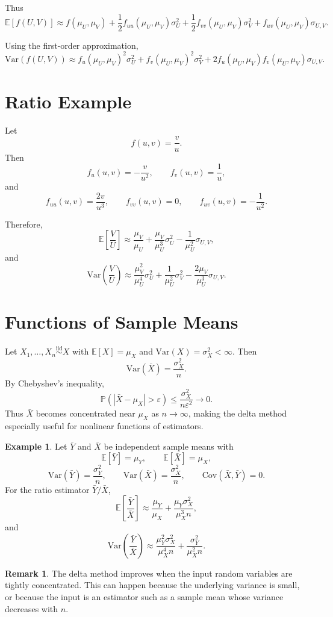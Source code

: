 \documentclass[12pt,oneside]{book}
\numberwithin{equation}{section}
\theoremstyle{definition}
\newtheorem{example}{Example}[section]
\newtheorem{remark}{Remark}[section]
\theoremstyle{plain}
\theoremstyle{remark}
\newcommand{\E}{\mathbb{E}}
\newcommand{\Var}{\mathrm{Var}}
\newcommand{\Cov}{\mathrm{Cov}}
\newcommand{\Prob}{\mathbb{P}}
\newcommand{\iid}{\overset{\text{iid}}{\sim}}
\begin{document}
Thus
\[
\E[f(U,V)]
\approx
f(\mu_U,\mu_V)
+ \frac{1}{2}f_{uu}(\mu_U,\mu_V)\sigma_U^2
+ \frac{1}{2}f_{vv}(\mu_U,\mu_V)\sigma_V^2
+ f_{uv}(\mu_U,\mu_V)\sigma_{U,V}.
\]

Using the first-order approximation,
\[
\Var(f(U,V))
\approx
f_u(\mu_U,\mu_V)^2\sigma_U^2
+
f_v(\mu_U,\mu_V)^2\sigma_V^2
+
2f_u(\mu_U,\mu_V)f_v(\mu_U,\mu_V)\sigma_{U,V}.
\]

\section{Ratio Example}

Let
\[
f(u,v)=\frac{v}{u}.
\]
Then
\[
f_u(u,v)=-\frac{v}{u^2},
\qquad
f_v(u,v)=\frac{1}{u},
\]
and
\[
f_{uu}(u,v)=\frac{2v}{u^3},
\qquad
f_{vv}(u,v)=0,
\qquad
f_{uv}(u,v)=-\frac{1}{u^2}.
\]

Therefore,
\[
\E\left[\frac{V}{U}\right]
\approx
\frac{\mu_V}{\mu_U}
+
\frac{\mu_V}{\mu_U^3}\sigma_U^2
-
\frac{1}{\mu_U^2}\sigma_{U,V},
\]
and
\[
\Var\left(\frac{V}{U}\right)
\approx
\frac{\mu_V^2}{\mu_U^4}\sigma_U^2
+
\frac{1}{\mu_U^2}\sigma_V^2
-
\frac{2\mu_V}{\mu_U^3}\sigma_{U,V}.
\]

\section{Functions of Sample Means}

Let $X_1,\ldots,X_n \iid X$ with $\E[X]=\mu_X$ and $\Var(X)=\sigma_X^2<\infty$. Then
\[
\Var(\bar{X})=\frac{\sigma_X^2}{n}.
\]
By Chebyshev's inequality,
\[
\Prob(|\bar{X}-\mu_X|>\varepsilon)
\le
\frac{\sigma_X^2}{n\varepsilon^2}
\to 0.
\]
Thus $\bar{X}$ becomes concentrated near $\mu_X$ as $n\to\infty$, making the delta method especially useful for nonlinear functions of estimators.

\begin{example}
Let $\bar{Y}$ and $\bar{X}$ be independent sample means with
\[
\E[\bar{Y}]=\mu_Y,
\qquad
\E[\bar{X}]=\mu_X,
\]
\[
\Var(\bar{Y})=\frac{\sigma_Y^2}{n},
\qquad
\Var(\bar{X})=\frac{\sigma_X^2}{n},
\qquad
\Cov(\bar{X},\bar{Y})=0.
\]
For the ratio estimator $\bar{Y}/\bar{X}$,
\[
\E\left[\frac{\bar{Y}}{\bar{X}}\right]
\approx
\frac{\mu_Y}{\mu_X}
+
\frac{\mu_Y\sigma_X^2}{\mu_X^3 n},
\]
and
\[
\Var\left(\frac{\bar{Y}}{\bar{X}}\right)
\approx
\frac{\mu_Y^2\sigma_X^2}{\mu_X^4 n}
+
\frac{\sigma_Y^2}{\mu_X^2 n}.
\]
\end{example}

\begin{remark}
The delta method improves when the input random variables are tightly concentrated. This can happen because the underlying variance is small, or because the input is an estimator such as a sample mean whose variance decreases with $n$.
\end{remark}
\end{document}
